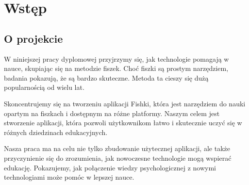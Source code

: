 \chapter{Wstęp}

\section{O projekcie}\label{ch:wstep}

W niniejszej pracy dyplomowej przyjrzymy się, jak technologie pomagają w nauce, skupiając się na metodzie fiszek. Choć fiszki są prostym narzędziem, badania pokazują, że są bardzo skuteczne. Metoda ta cieszy się dużą popularnością od wielu lat.


Skoncentrujemy się na tworzeniu aplikacji Fishki, która jest narzędziem do nauki opartym na fiszkach i dostępnym na różne platformy. Naszym celem jest stworzenie aplikacji, która pozwoli użytkownikom łatwo i skutecznie uczyć się w różnych dziedzinach edukacyjnych.

Nasza praca ma na celu nie tylko zbudowanie użytecznej aplikacji, ale także przyczynienie się do zrozumienia, jak nowoczesne technologie mogą wspierać edukację. Pokazujemy, jak połączenie wiedzy psychologicznej z nowymi technologiami może pomóc w lepszej nauce.
